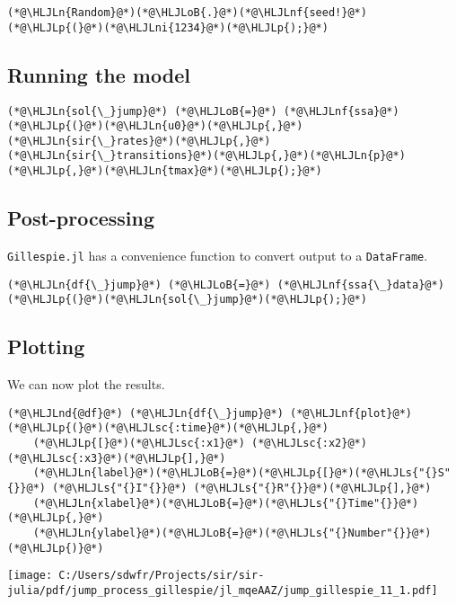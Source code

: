 \documentclass[12pt,a4paper]{article}
\newcommand{\HLJLn}[1]{#1}
\newcommand{\HLJLnd}[1]{\textcolor[RGB]{214,102,97}{#1}}
\newcommand{\HLJLnf}[1]{\textcolor[RGB]{66,102,213}{#1}}
\newcommand{\HLJLs}[1]{\textcolor[RGB]{201,61,57}{#1}}
\newcommand{\HLJLsc}[1]{\textcolor[RGB]{201,61,57}{#1}}
\newcommand{\HLJLni}[1]{\textcolor[RGB]{59,151,46}{#1}}
\newcommand{\HLJLoB}[1]{\textcolor[RGB]{102,102,102}{\textbf{#1}}}
\newcommand{\HLJLp}[1]{#1}
\begin{document}
\begin{lstlisting}
(*@\HLJLn{Random}@*)(*@\HLJLoB{.}@*)(*@\HLJLnf{seed!}@*)(*@\HLJLp{(}@*)(*@\HLJLni{1234}@*)(*@\HLJLp{);}@*)
\end{lstlisting}


\subsection{Running the model}

\begin{lstlisting}
(*@\HLJLn{sol{\_}jump}@*) (*@\HLJLoB{=}@*) (*@\HLJLnf{ssa}@*)(*@\HLJLp{(}@*)(*@\HLJLn{u0}@*)(*@\HLJLp{,}@*)(*@\HLJLn{sir{\_}rates}@*)(*@\HLJLp{,}@*)(*@\HLJLn{sir{\_}transitions}@*)(*@\HLJLp{,}@*)(*@\HLJLn{p}@*)(*@\HLJLp{,}@*)(*@\HLJLn{tmax}@*)(*@\HLJLp{);}@*)
\end{lstlisting}


\subsection{Post-processing}
\texttt{Gillespie.jl} has a convenience function to convert output to a \texttt{DataFrame}.


\begin{lstlisting}
(*@\HLJLn{df{\_}jump}@*) (*@\HLJLoB{=}@*) (*@\HLJLnf{ssa{\_}data}@*)(*@\HLJLp{(}@*)(*@\HLJLn{sol{\_}jump}@*)(*@\HLJLp{);}@*)
\end{lstlisting}


\subsection{Plotting}
We can now plot the results.


\begin{lstlisting}
(*@\HLJLnd{@df}@*) (*@\HLJLn{df{\_}jump}@*) (*@\HLJLnf{plot}@*)(*@\HLJLp{(}@*)(*@\HLJLsc{:time}@*)(*@\HLJLp{,}@*)
    (*@\HLJLp{[}@*)(*@\HLJLsc{:x1}@*) (*@\HLJLsc{:x2}@*) (*@\HLJLsc{:x3}@*)(*@\HLJLp{],}@*)
    (*@\HLJLn{label}@*)(*@\HLJLoB{=}@*)(*@\HLJLp{[}@*)(*@\HLJLs{"{}S"{}}@*) (*@\HLJLs{"{}I"{}}@*) (*@\HLJLs{"{}R"{}}@*)(*@\HLJLp{],}@*)
    (*@\HLJLn{xlabel}@*)(*@\HLJLoB{=}@*)(*@\HLJLs{"{}Time"{}}@*)(*@\HLJLp{,}@*)
    (*@\HLJLn{ylabel}@*)(*@\HLJLoB{=}@*)(*@\HLJLs{"{}Number"{}}@*)(*@\HLJLp{)}@*)
\end{lstlisting}

\texttt{[image: C:/Users/sdwfr/Projects/sir/sir-julia/pdf/jump\_process\_gillespie/jl\_mqeAAZ/jump\_gillespie\_11\_1.pdf]}
\end{document}
